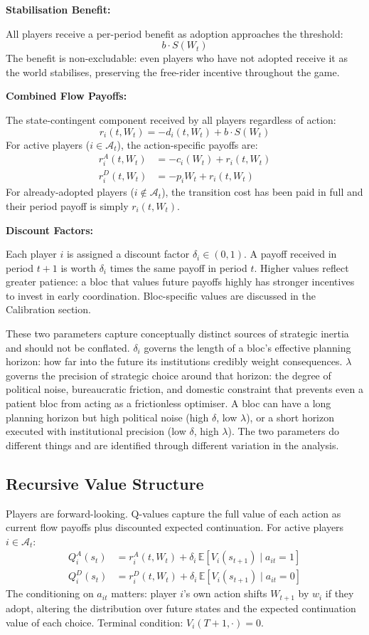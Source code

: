 \documentclass[10pt,a4paper]{article}
\newcommand{\bpar}[1]{\medskip\noindent\textbf{#1}\par}
\begin{document}
\bpar{Stabilisation Benefit:}
All players receive a per-period benefit as adoption approaches the threshold:
\[
b \cdot S(W_t)
\]
The benefit is non-excludable: even players who have not adopted receive it as the world
stabilises, preserving the free-rider incentive throughout the game.

\bpar{Combined Flow Payoffs:}
The state-contingent component received by all players regardless of action:
\[
r_i(t, W_t) = -d_i(t, W_t) + b \cdot S(W_t)
\]
For active players ($i \in \mathcal{A}_t$), the action-specific payoffs are:
\begin{align*}
r_i^A(t, W_t) &= -c_i(W_t) + r_i(t, W_t) \\
r_i^D(t, W_t) &= -p_i W_t + r_i(t, W_t)
\end{align*}
For already-adopted players ($i \notin \mathcal{A}_t$), the transition cost has been paid in
full and their period payoff is simply $r_i(t, W_t)$.

\bpar{Discount Factors:}
Each player $i$ is assigned a discount factor $\delta_i \in (0,1)$. A payoff received in
period $t+1$ is worth $\delta_i$ times the same payoff in period $t$. Higher values reflect
greater patience: a bloc that values future payoffs highly has stronger incentives to invest
in early coordination. Bloc-specific values are discussed in the Calibration section.

These two parameters capture conceptually distinct sources of strategic inertia and should
not be conflated. $\delta_i$ governs the length of a bloc's effective planning horizon:
how far into the future its institutions credibly weight consequences. $\lambda$ governs the
precision of strategic choice around that horizon: the degree of political noise, bureaucratic
friction, and domestic constraint that prevents even a patient bloc from acting as a
frictionless optimiser. A bloc can have a long planning horizon but high political noise
(high $\delta$, low $\lambda$), or a short horizon executed with institutional precision
(low $\delta$, high $\lambda$). The two parameters do different things and are identified
through different variation in the analysis.

\needspace{12em}
\subsection*{Recursive Value Structure}

Players are forward-looking. Q-values capture the full value of each action as current flow
payoffs plus discounted expected continuation. For active players $i \in \mathcal{A}_t$:
\begin{align*}
Q_i^A(s_t) &= r_i^A(t, W_t) + \delta_i\, \mathbb{E}[V_i(s_{t+1}) \mid a_{it} = 1] \\
Q_i^D(s_t) &= r_i^D(t, W_t) + \delta_i\, \mathbb{E}[V_i(s_{t+1}) \mid a_{it} = 0]
\end{align*}
The conditioning on $a_{it}$ matters: player $i$'s own action shifts $W_{t+1}$ by $w_i$ if
they adopt, altering the distribution over future states and the expected continuation value
of each choice. Terminal condition: $V_i(T+1, \cdot) = 0$.
\end{document}
